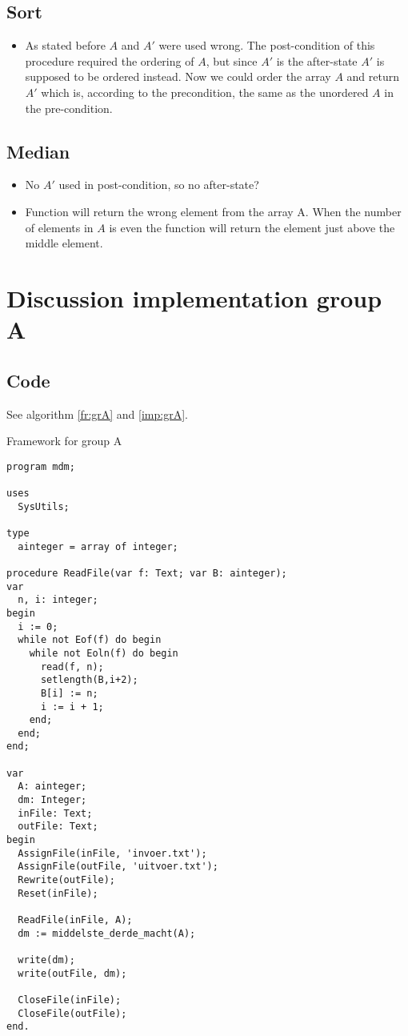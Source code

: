 \documentclass[a4paper,twoside,11pt]{article}
\begin{document}
\subsection{Sort}
\begin{itemize}
    \item As stated before $A$ and $A'$ were used wrong. The post-condition of this procedure required the ordering of $A$, but since $A'$ is the after-state $A'$ is supposed to be ordered instead. Now we could order the array $A$ and return $A'$ which is, according to the precondition, the same as the unordered $A$ in the pre-condition.
\end{itemize}
\subsection{Median}
\begin{itemize}
    \item No $A'$ used in post-condition, so no after-state?
    \item Function will return the wrong element from the array A. When the number of elements in $A$ is even the function will return the element just above the middle element.
\end{itemize}

\section{Discussion implementation group A}
\subsection{Code}
See algorithm \ref{fr:grA} and \ref{imp:grA}.

\begin{algorithm}
\caption{Framework for group A}
\label{fr:grA}
\begin{lstlisting}
program mdm;

uses
  SysUtils;

type
  ainteger = array of integer;

procedure ReadFile(var f: Text; var B: ainteger);
var
  n, i: integer;
begin
  i := 0;
  while not Eof(f) do begin
    while not Eoln(f) do begin
      read(f, n);
      setlength(B,i+2);
      B[i] := n;
      i := i + 1;
    end;
  end;
end;

var
  A: ainteger;
  dm: Integer;
  inFile: Text;
  outFile: Text;
begin
  AssignFile(inFile, 'invoer.txt');
  AssignFile(outFile, 'uitvoer.txt');
  Rewrite(outFile);
  Reset(inFile);

  ReadFile(inFile, A);
  dm := middelste_derde_macht(A);

  write(dm);
  write(outFile, dm);

  CloseFile(inFile);
  CloseFile(outFile);
end.
\end{lstlisting}
\end{algorithm}
\end{document}

